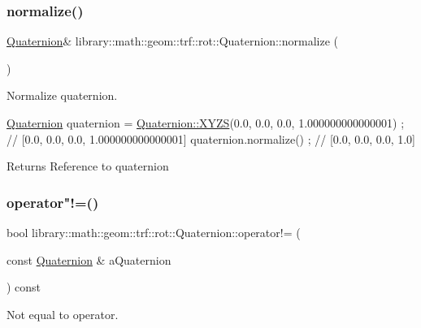 \subsubsection{\texorpdfstring{normalize()}{normalize()}}
{\footnotesize\ttfamily \hyperlink{classlibrary_1_1math_1_1geom_1_1trf_1_1rot_1_1_quaternion}{Quaternion}\& library\+::math\+::geom\+::trf\+::rot\+::\+Quaternion\+::normalize (\begin{DoxyParamCaption}{ }\end{DoxyParamCaption})}



Normalize quaternion. 


\begin{DoxyCode}
\hyperlink{classlibrary_1_1math_1_1geom_1_1trf_1_1rot_1_1_quaternion_aa7f459a08f5af38b9f7676a6bf36a21c}{Quaternion} quaternion = \hyperlink{classlibrary_1_1math_1_1geom_1_1trf_1_1rot_1_1_quaternion_ad6426210c54c79fc5296b5375380a7ca}{Quaternion::XYZS}(0.0, 0.0, 0.0, 1.000000000000001) ; \textcolor{comment}{//
       [0.0, 0.0, 0.0, 1.000000000000001]}
quaternion.normalize() ; \textcolor{comment}{// [0.0, 0.0, 0.0, 1.0]}
\end{DoxyCode}


\begin{DoxyReturn}{Returns}
Reference to quaternion 
\end{DoxyReturn}
\mbox{\label{classlibrary_1_1math_1_1geom_1_1trf_1_1rot_1_1_quaternion_ad32520a30642548650622e22c6686e64}} 
\subsubsection{\texorpdfstring{operator"!=()}{operator!=()}}
{\footnotesize\ttfamily bool library\+::math\+::geom\+::trf\+::rot\+::\+Quaternion\+::operator!= (\begin{DoxyParamCaption}\item[{const \hyperlink{classlibrary_1_1math_1_1geom_1_1trf_1_1rot_1_1_quaternion}{Quaternion} \&}]{a\+Quaternion }\end{DoxyParamCaption}) const}



Not equal to operator. 


